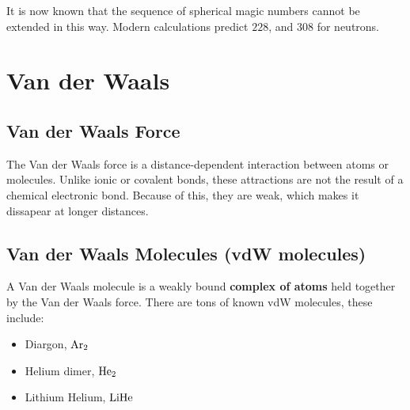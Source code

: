 \documentclass{article}
\begin{document}
\begin{multicols*}{2}
    It is now known that the sequence of spherical magic numbers cannot be extended in this
    way. Modern calculations predict $228$, and $308$ for neutrons.

    \section{Van der Waals}
    \subsection{Van der Waals Force}
    The Van der Waals force is a distance-dependent interaction between atoms or
    molecules. Unlike ionic or covalent bonds, these attractions are not the result
    of a chemical electronic bond. Because of this, they are weak, which makes it
    dissapear at longer distances.
    \subsection{Van der Waals Molecules (vdW molecules)}
    A Van der Waals molecule is a weakly bound \textbf{complex of atoms} held together
    by the Van der Waals force. There are tons of known vdW molecules, these include:
    \begin{itemize}
      \item Diargon, $\ce{Ar2}$
      \item Helium dimer, $\ce{He2}$
      \item Lithium Helium, $\ce{LiHe}$
    \end{itemize}
  \end{multicols*}
\end{document}
